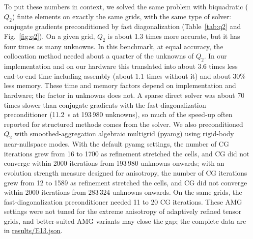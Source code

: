 \documentclass[preprint,12pt]{elsarticle}
\theoremstyle{remark}
\begin{document}
To put these numbers in context, we solved the same problem with biquadratic ($Q_2$) finite elements on
exactly the same grids, with the same type of solver: conjugate gradients preconditioned by fast
diagonalization (Table~\ref{tab:q2} and Fig.~\ref{fig:q2}). On a given grid, $Q_2$ is about 1.3 times more
accurate, but it has four times as many unknowns. In this benchmark, at equal accuracy, the collocation method needed about a quarter of the unknowns of $Q_2$. In our implementation and on our hardware this translated into about 3.6 times less end-to-end time
including assembly (about 1.1 times without it) and about 30\% less memory. These time and memory factors depend on implementation and
hardware; the factor in unknowns does not. A sparse direct solver was about 70 times slower than conjugate gradients with the
fast-diagonalization preconditioner (11.2~s at 193\,980 unknowns), so much of the speed-up often reported for structured methods comes from the
solver. We also preconditioned $Q_2$ with smoothed-aggregation algebraic multigrid (pyamg) using rigid-body near-nullspace modes. With the default pyamg settings, the number of CG iterations grew from 16 to 1700 as refinement stretched the cells, and CG did not converge within 2000 iterations from 193\,980 unknowns onwards; with an evolution strength measure designed for anisotropy, the number of CG iterations grew from 12 to 1589 as refinement stretched the cells, and CG did not converge within 2000 iterations from 283\,324 unknowns onwards. On the same grids, the fast-diagonalization preconditioner needed 11 to 20 CG iterations. These AMG settings were not tuned for the extreme anisotropy of adaptively refined tensor grids, and better-suited AMG variants may close the gap; the complete data are in \url{results/E13.json}.
\end{document}
